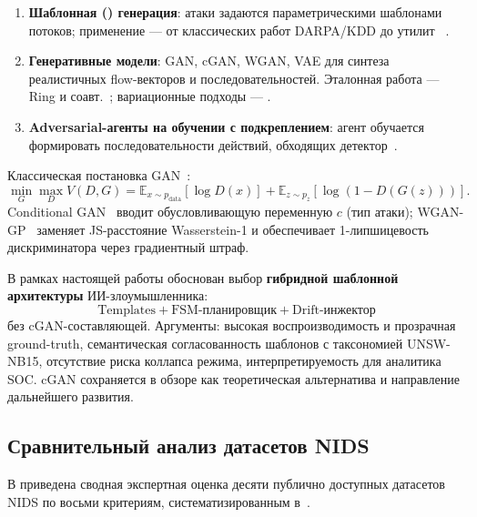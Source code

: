 \begin{enumerate}
    \item \textbf{Шаблонная () генерация}:
    атаки задаются параметрическими шаблонами потоков;
    применение --- от классических работ DARPA/KDD до утилит
    ~\cite{lippmann2000darpa, gharib2016evalframework}.
    \item \textbf{Генеративные модели}: GAN, cGAN, WGAN, VAE для синтеза
    реалистичных flow-векторов и последовательностей. Эталонная
    работа --- Ring и соавт.~\cite{ring2019flowgan}; вариационные подходы ---
    \cite{lopez2017cvae}.
    \item \textbf{Adversarial-агенты на обучении с подкреплением}:
    агент обучается формировать последовательности действий,
    обходящих детектор~\cite{apruzzese2020adversarial}.
\end{enumerate}

Классическая постановка GAN~\cite{goodfellow2014gan}:
\begin{equation}
\min_{G}\max_{D}
V(D,G) = \mathbb{E}_{x \sim p_{\text{data}}}[\log D(x)] +
         \mathbb{E}_{z \sim p_z}[\log(1 - D(G(z)))].
\label{eq:gan}
\end{equation}
Conditional GAN~\cite{mirza2014cgan} вводит обусловливающую переменную
\(c\) (тип атаки); WGAN-GP~\cite{arjovsky2017wgan, gulrajani2017wgangp}
заменяет JS-расстояние Wasserstein-1 и обеспечивает 1-липшицевость
дискриминатора через градиентный штраф.

В рамках настоящей работы обоснован выбор \textbf{гибридной шаблонной
архитектуры} ИИ-злоумышленника:
\[
\text{Templates} + \text{FSM-планировщик} + \text{Drift-инжектор}
\]
без cGAN-составляющей. Аргументы: высокая воспроизводимость и
прозрачная ground-truth, семантическая согласованность шаблонов
с таксономией UNSW-NB15, отсутствие риска коллапса режима,
интерпретируемость для аналитика SOC. cGAN сохраняется в обзоре
как теоретическая альтернатива и направление дальнейшего развития.

\subsection{Сравнительный анализ датасетов NIDS}

В  приведена сводная экспертная оценка
десяти публично доступных датасетов NIDS по восьми
критериям, систематизированным в~\cite{gharib2016evalframework,
sharafaldin2018toward}.

